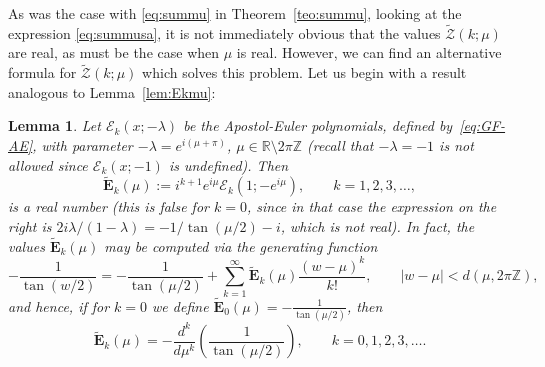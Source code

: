 \documentclass[11pt, oneside]{article}
\newcommand{\Z}{\mathbb{Z}}
\newcommand{\R}{\mathbb{R}}
\newcommand{\calE}{\mathcal{E}}
\newcommand{\bfE}{\mathbf{E}}
\newcommand{\calZ}{\mathcal{Z}}
\theoremstyle{plain}
\newtheorem{lemma}[theorem]{Lemma}
\theoremstyle{definition}
\begin{document}
As was the case with \eqref{eq:summu} in Theorem~\ref{teo:summu}, looking at the expression \eqref{eq:summusa}, it is not immediately obvious that the values $\widetilde{\calZ}(k;\mu)$ are real, as must be the case when $\mu$ is real. However, we can find an alternative formula for $\widetilde{\calZ}(k;\mu)$ which solves this problem. Let us begin with a result analogous to Lemma~\ref{lem:Ekmu}:

\begin{lemma}
\label{lem:Ekmutilde}
Let $\calE_k(x;-\lambda)$ be the Apostol-Euler polynomials, defined by~\eqref{eq:GF-AE}, with parameter $-\lambda = e^{i(\mu+\pi)}$, $\mu \in \R \setminus 2\pi\Z$ (recall that $-\lambda=-1$ is not allowed since $\calE_k(x;-1)$ is undefined). Then 
\begin{equation*}
  \widetilde{\bfE}_k(\mu)  
  := i^{k+1} e^{i\mu} \calE_k(1;-e^{i\mu}),
  \qquad k=1,2,3,\dots,
\end{equation*}
is a real number (this is false for $k=0$, since in that case the expression on the right is $2i\lambda/(1-\lambda) = -1/\tan(\mu/2)-i$, which is not real). In fact, the values $\widetilde{\bfE}_k(\mu)$ may be computed via the generating function
\begin{equation}
\label{eq:Ekmutilde}
  -\frac{1}{\tan(w/2)}   
  = -\frac{1}{\tan(\mu/2)} + \sum_{k=1}^{\infty} \widetilde{\bfE}_k(\mu) \frac{(w-\mu)^k}{k!},
  \qquad |w - \mu| < d(\mu, 2\pi\Z), 
\end{equation}
and hence, if for $k = 0$ we define $\widetilde{\bfE}_0(\mu) = -\frac{1}{\tan(\mu/2)}$, then
\[
  \widetilde{\bfE}_k(\mu) = -\frac{d^k}{d\mu^k} \left(\frac{1}{\tan(\mu/2)}\right),
  \qquad k=0,1,2,3,\dots. 
\]
\end{lemma}
\end{document}
